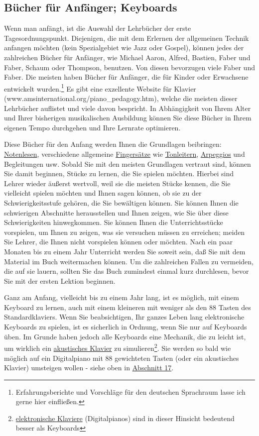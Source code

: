 \subsection{Bücher für Anfänger; Keyboards}\hypertarget{c1iii18b}{}

Wenn man anfängt, ist die Auswahl der Lehrbücher der erste Tagesordnungspunkt.
Diejenigen, die mit dem Erlernen der allgemeinen Technik anfangen möchten (kein Spezialgebiet wie Jazz oder Gospel), können jedes der zahlreichen Bücher für Anfänger, wie Michael Aaron, Alfred, Bastien, Faber und Faber, Schaum oder Thompson, benutzen.
Von diesen bevorzugen viele Faber und Faber.
Die meisten haben Bücher für Anfänger, die für Kinder oder Erwachsene entwickelt wurden.\footnote{Erfahrungsberichte und Vorschläge für den deutschen Sprachraum lasse ich gerne hier einfließen.}
Es gibt eine exzellente Website für Klavier (www.amsinternational.org/piano\_pedagogy.htm), welche die meisten dieser Lehrbücher auflistet und viele davon bespricht.
In Abhängigkeit von Ihrem Alter und Ihrer bisherigen musikalischen Ausbildung können Sie diese Bücher in Ihrem eigenen Tempo durchgehen und Ihre Lernrate optimieren.

Diese Bücher für den Anfang werden Ihnen die Grundlagen beibringen: \hyperlink{c1iii11}{Notenlesen}, verschiedene allgemeine \hyperlink{c1ii18}{Fingersätze} wie \hyperlink{c1iii5a}{Tonleitern}, \hyperlink{Arpeggios}{Arpeggios} und Begleitungen usw.
Sobald Sie mit den meisten Grundlagen vertraut sind, können Sie damit beginnen, Stücke zu lernen, die Sie spielen möchten.
Hierbei sind Lehrer wieder äußerst wertvoll, weil sie die meisten Stücke kennen, die Sie vielleicht spielen möchten und 
Ihnen sagen können, ob sie zu der Schwierigkeitsstufe gehören, die Sie bewältigen können.
Sie können Ihnen die schwierigen Abschnitte herausstellen und Ihnen zeigen, wie Sie über diese Schwierigkeiten hinwegkommen.
Sie können Ihnen die Unterrichtsstücke vorspielen, um Ihnen zu zeigen, was sie versuchen müssen zu erreichen; meiden Sie Lehrer, die Ihnen nicht vorspielen können oder möchten.
Nach ein paar Monaten bis zu einem Jahr Unterricht werden Sie soweit sein, daß Sie mit dem Material im Buch weitermachen können.
Um die zahlreichen Fallen zu vermeiden, die auf sie lauern, sollten Sie das Buch zumindest einmal kurz durchlesen, bevor Sie mit der ersten Lektion beginnen.

Ganz am Anfang, vielleicht bis zu einem Jahr lang, ist es möglich, mit einem Keyboard zu lernen, auch mit einem kleineren mit weniger als den 88 Tasten des Standardklaviers.
Wenn Sie beabsichtigen, Ihr ganzes Leben lang elektronische Keyboards zu spielen, ist es sicherlich in Ordnung, wenn Sie nur auf Keyboards üben.
Im Grunde haben jedoch alle Keyboards eine Mechanik, die zu leicht ist, um wirklich ein \hyperlink{c1iii17c}{akustisches Klavier} zu simulieren\footnote{\hyperlink{c1iii17b}{elektronische Klaviere} (Digitalpianos) sind in dieser Hinsicht bedeutend besser als Keyboards}.
Sie werden so bald wie möglich auf ein Digitalpiano mit 88 gewichteten Tasten (oder ein akustisches Klavier) umsteigen wollen - siehe oben in \hyperlink{c1iii17}{Abschnitt 17}.


